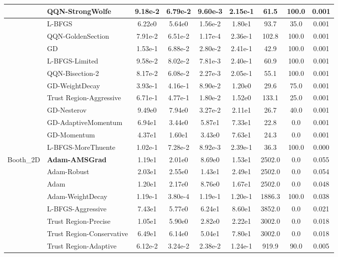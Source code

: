 \documentclass[10pt]{article}
\begin{document}
\begin{longtable}{|l|l|c|c|c|c|c|c|c|}
\hline
 & QQN-StrongWolfe & 9.18e-2 & 6.79e-2 & 9.60e-3 & 2.15e-1 & 61.5 & 100.0 & 0.001 \\
\hline
 & L-BFGS & 6.22e0 & 5.64e0 & 1.56e-2 & 1.80e1 & 93.7 & 35.0 & 0.001 \\
\hline
 & QQN-GoldenSection & 7.91e-2 & 6.51e-2 & 1.17e-4 & 2.36e-1 & 102.8 & 100.0 & 0.001 \\
\hline
 & GD & 1.53e-1 & 6.88e-2 & 2.80e-2 & 2.41e-1 & 42.9 & 100.0 & 0.001 \\
\hline
 & L-BFGS-Limited & 9.58e-2 & 8.02e-2 & 7.81e-3 & 2.40e-1 & 60.9 & 100.0 & 0.001 \\
\hline
 & QQN-Bisection-2 & 8.17e-2 & 6.08e-2 & 2.27e-3 & 2.05e-1 & 55.1 & 100.0 & 0.001 \\
\hline
 & GD-WeightDecay & 3.93e-1 & 4.16e-1 & 8.90e-2 & 1.20e0 & 29.6 & 75.0 & 0.001 \\
\hline
 & Trust Region-Aggressive & 6.71e-1 & 4.77e-1 & 1.80e-2 & 1.52e0 & 133.1 & 25.0 & 0.001 \\
\hline
 & GD-Nesterov & 9.49e0 & 7.94e0 & 3.27e-2 & 2.11e1 & 26.7 & 40.0 & 0.001 \\
\hline
 & GD-AdaptiveMomentum & 6.94e1 & 3.44e0 & 5.87e1 & 7.33e1 & 22.8 & 0.0 & 0.001 \\
\hline
 & GD-Momentum & 4.37e1 & 1.60e1 & 3.43e0 & 7.63e1 & 24.3 & 0.0 & 0.001 \\
\hline
 & L-BFGS-MoreThuente & 1.02e-1 & 7.28e-2 & 8.92e-3 & 2.39e-1 & 36.3 & 100.0 & 0.000 \\
Booth\_2D & \textbf{Adam-AMSGrad} & 1.19e1 & 2.01e0 & 8.69e0 & 1.53e1 & 2502.0 & 0.0 & 0.055 \\
\hline
 & Adam-Robust & 2.03e1 & 2.55e0 & 1.43e1 & 2.49e1 & 2502.0 & 0.0 & 0.054 \\
\hline
 & Adam & 1.20e1 & 2.17e0 & 8.76e0 & 1.67e1 & 2502.0 & 0.0 & 0.048 \\
\hline
 & Adam-WeightDecay & 1.19e-1 & 3.80e-4 & 1.19e-1 & 1.20e-1 & 1886.3 & 100.0 & 0.038 \\
\hline
 & L-BFGS-Aggressive & 7.43e1 & 5.77e0 & 6.24e1 & 8.60e1 & 3852.0 & 0.0 & 0.021 \\
\hline
 & Trust Region-Precise & 1.05e1 & 5.90e0 & 2.82e0 & 2.22e1 & 3002.0 & 0.0 & 0.018 \\
\hline
 & Trust Region-Conservative & 6.49e1 & 6.14e0 & 5.04e1 & 7.80e1 & 3002.0 & 0.0 & 0.018 \\
\hline
 & Trust Region-Adaptive & 6.12e-2 & 3.24e-2 & 2.38e-2 & 1.24e-1 & 919.9 & 90.0 & 0.005 \\
\hline

\end{longtable}
\end{document}
